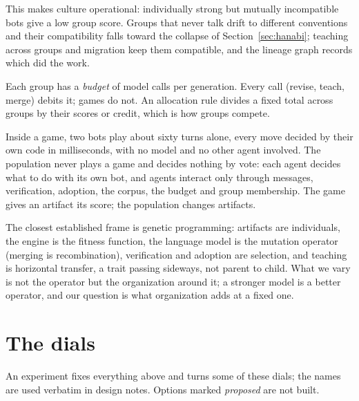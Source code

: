 \documentclass[11pt]{article}
\numberwithin{theorem}{section}
\theoremstyle{definition}
\begin{document}
This makes culture operational: individually strong but mutually incompatible bots give a low group score. Groups
that never talk drift to different conventions and their compatibility falls toward the collapse of
Section~\ref{sec:hanabi}; teaching across groups and migration keep them compatible, and the lineage graph records which
did the work.

\begin{definition}[Budget]
Each group has a \emph{budget} of model calls per generation. Every call (revise, teach, merge) debits it; games do not.
An allocation rule divides a fixed total across groups by their scores or credit, which is how groups compete.
\end{definition}

\begin{remark}
Inside a game, two bots play about sixty turns alone, every move decided by their own code in milliseconds, with no
model and no other agent involved. The population never plays a game and decides nothing by vote: each agent
decides what to do with its own bot, and agents interact only through messages, verification, adoption, the corpus, the
budget and group membership. The game gives an artifact its score; the population changes artifacts.
\end{remark}

\begin{remark}
The closest established frame is genetic programming: artifacts are individuals, the engine is the fitness function,
the language model is the mutation operator (merging is recombination), verification and adoption are selection, and
teaching is horizontal transfer, a trait passing sideways, not parent to child. What we vary is not the
operator but the organization around it; a stronger model is a better operator, and our question is what organization
adds at a fixed one.
\end{remark}

\section{The dials}\label{sec:dials}

An experiment fixes everything above and turns some of these dials; the names are used verbatim in design notes.
Options marked \emph{proposed} are not built.
\end{document}
